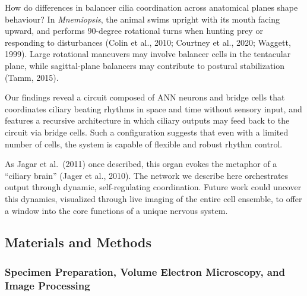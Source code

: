 \documentclass[
  11pt,
]{article}
\begin{document}
How do differences in balancer cilia coordination across anatomical
planes shape behaviour? In \emph{Mnemiopsis}, the animal swims upright
with its mouth facing upward, and performs 90-degree rotational turns
when hunting prey or responding to disturbances (Colin et al., 2010;
Courtney et al., 2020; Waggett, 1999). Large rotational maneuvers may
involve balancer cells in the tentacular plane, while sagittal-plane
balancers may contribute to postural stabilization (Tamm, 2015).

Our findings reveal a circuit composed of ANN neurons and bridge cells
that coordinates ciliary beating rhythms in space and time without
sensory input, and features a recursive architecture in which ciliary
outputs may feed back to the circuit via bridge cells. Such a
configuration suggests that even with a limited number of cells, the
system is capable of flexible and robust rhythm control.

As Jagar et al.~(2011) once described, this organ evokes the metaphor of
a ``ciliary brain'' (Jager et al., 2010). The network we describe here
orchestrates output through dynamic, self-regulating coordination.
Future work could uncover this dynamics, visualized through live imaging
of the entire cell ensemble, to offer a window into the core functions
of a unique nervous system.

\subsection{Materials and Methods}\label{materials-and-methods}

\subsubsection{Specimen Preparation, Volume Electron Microscopy, and
Image
Processing}\label{specimen-preparation-volume-electron-microscopy-and-image-processing}
\end{document}
